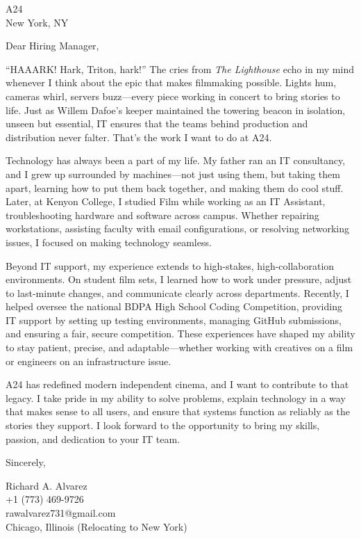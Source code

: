 \documentclass[a4paper,10pt]{letter}
\begin{document}
\begin{letter}{
A24 \\
New York, NY}

\opening{Dear Hiring Manager,}

“HAAARK! Hark, Triton, hark!” The cries from \emph{The Lighthouse} echo in my mind whenever I think about the epic that makes filmmaking possible. Lights hum, cameras whirl, servers buzz—every piece working in concert to bring stories to life. Just as Willem Dafoe’s keeper maintained the towering beacon in isolation, unseen but essential, IT ensures that the teams behind production and distribution never falter. That’s the work I want to do at A24.

Technology has always been a part of my life. My father ran an IT consultancy, and I grew up surrounded by machines—not just using them, but taking them apart, learning how to put them back together, and making them do cool stuff. Later, at Kenyon College, I studied Film while working as an IT Assistant, troubleshooting hardware and software across campus. Whether repairing workstations, assisting faculty with email configurations, or resolving networking issues, I focused on making technology seamless. 

Beyond IT support, my experience extends to high-stakes, high-collaboration environments. On student film sets, I learned how to work under pressure, adjust to last-minute changes, and communicate clearly across departments. Recently, I helped oversee the national BDPA High School Coding Competition, providing IT support by setting up testing environments, managing GitHub submissions, and ensuring a fair, secure competition. These experiences have shaped my ability to stay patient, precise, and adaptable—whether working with creatives on a film or engineers on an infrastructure issue.

A24 has redefined modern independent cinema, and I want to contribute to that legacy. I take pride in my ability to solve problems, explain technology in a way that makes sense to all users, and ensure that systems function as reliably as the stories they support. I look forward to the opportunity to bring my skills, passion, and dedication to your IT team.

\closing{Sincerely,}

Richard A. Alvarez \\
+1 (773) 469-9726 \\
rawalvarez731@gmail.com \\
Chicago, Illinois (Relocating to New York)

\end{letter}
\end{document}
